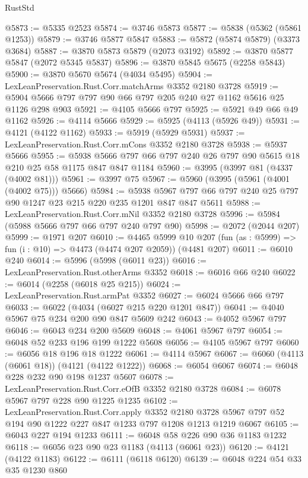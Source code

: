 \begin{lexlean}{RustStd}
\begin{coremodule}
@5873 := @5335 @2523
@5874 := @3746 @5873
@5877 := @5838 (@5362 (@5861 @1253))
@5879 := @3746 @5877 @5847
@5883 := @5872 (@5874 @5879) (@3373 @3684)
@5887 := @3870 @5873 @5879 (@2073 @3192)
@5892 := @3870 @5877 @5847 (@2072 @5345 @5837)
@5896 := @3870 @5845 @5675 (@2258 @5843)
@5900 := @3870 @5670 @5674 (@4034 @5495)
@5904 := LexLeanPreservation.Rust.Corr.matchArms @3352 @2180 @3728
@5919 := @5904 @5666 @797 @797 @90 @66 @797 @205 @240 @27 @1162 @5616 @25 @1126 @298 @903
@5921 := @4105 @5666 @797
@5925 := @5921 @49 @66 @49 @1162
@5926 := @4114 @5666
@5929 := @5925 (@4113 (@5926 @49))
@5931 := @4121 (@4122 @1162)
@5933 := @5919 (@5929 @5931)
@5937 := LexLeanPreservation.Rust.Corr.mCons @3352 @2180 @3728
@5938 := @5937 @5666
@5955 := @5938 @5666 @797 @66 @797 @240 @26 @797 @90 @5615 @18 @210 @25 @58 @1175 @847 @847 @1184
@5960 := @3995 (@3997 @81 (@4337 (@4002 @81)))
@5961 := @3997 @75
@5967 := @5960 (@3995 (@5961 (@4001 (@4002 @75))) @5666)
@5984 := @5938 @5967 @797 @66 @797 @240 @25 @797 @90 @1247 @23 @215 @220 @235 @1201 @847 @847 @5611
@5988 := LexLeanPreservation.Rust.Corr.mNil @3352 @2180 @3728
@5996 := @5984 (@5988 @5666 @797 @66 @797 @240 @797 @90)
@5998 := @2072 (@2044 @207)
@5999 := @1971 @207
@6010 := @4465
    @5999
    @10
    @207
    (fun (as : @5999) => fun (i : @10) => @4473 (@4474 @207 @2059))
    (@4481 @207)
@6011 := @6010 @240
@6014 := @5996 (@5998 (@6011 @23))
@6016 := LexLeanPreservation.Rust.otherArms @3352
@6018 := @6016 @66 @240
@6022 := @6014 (@2258 (@6018 @25 @215))
@6024 := LexLeanPreservation.Rust.armPat @3352
@6027 := @6024 @5666 @66 @797
@6033 := @6022 (@4034 (@6027 @215 @220 @1201 @847))
@6041 := @4040 @5967 @75 @234 @200 @90 @847 @5609 @242
@6043 := @4052 @5967 @797
@6046 := @6043 @234 @200 @5609
@6048 := @4061 @5967 @797
@6054 := @6048 @52 @233 @196 @199 @1222 @5608
@6056 := @4105 @5967 @797
@6060 := @6056 @18 @196 @18 @1222
@6061 := @4114 @5967
@6067 := @6060 (@4113 (@6061 @18)) (@4121 (@4122 @1222))
@6068 := @6054 @6067
@6074 := @6048 @228 @232 @90 @198 @1237 @5607
@6078 := LexLeanPreservation.Rust.Corr.eOfB @3352 @2180 @3728
@6084 := @6078 @5967 @797 @228 @90 @1225 @1235
@6102 := LexLeanPreservation.Rust.Corr.apply
    @3352
    @2180
    @3728
    @5967
    @797
    @52
    @194
    @90
    @1222
    @227
    @847
    @1233
    @797
    @1208
    @1213
    @1219
    @6067
@6105 := @6043 @227 @194 @1233
@6111 := @6048 @58 @226 @90 @36 @1183 @1232
@6118 := @6056 @23 @90 @23 @1183 (@4113 (@6061 @23))
@6120 := @4121 (@4122 @1183)
@6122 := @6111 (@6118 @6120)
@6139 := @6048
    @224
    @54
    @33
    @35
    @1230
    @860

\end{coremodule}
\end{lexlean}

